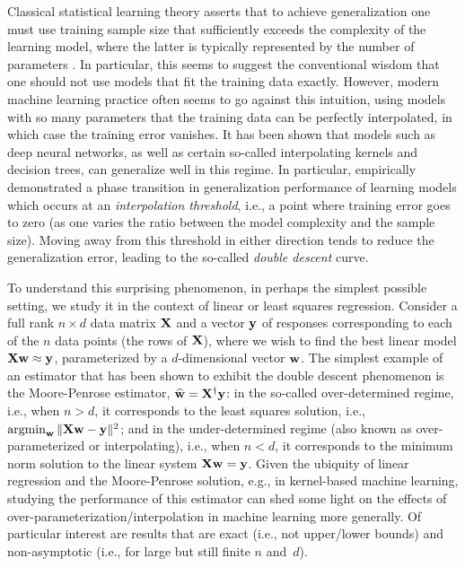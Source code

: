 \documentclass[../../thesis.tex]{subfiles}
\begin{document}
Classical statistical learning theory asserts that to achieve generalization
one must use training sample size that sufficiently exceeds the complexity of
the learning model, where the latter is typically represented by the number of
parameters \citep[or some related structural parameter; see][]{HFT09}.  In particular,
this seems to suggest the conventional wisdom that one should not use models
that fit the training data exactly.  However, modern machine learning practice
often seems to go against this intuition, using models with so many parameters
that the training data can be perfectly interpolated, in which case the
training error vanishes. It has been shown that models such as deep neural
networks, as well as certain so-called interpolating kernels and decision
trees, can generalize well in this regime. In particular,
\cite{BHMM19} empirically demonstrated a phase transition in generalization
performance of learning models which occurs at an \emph{interpolation
  threshold}, i.e., a point where training error goes to zero (as one varies the
ratio between the model complexity and the sample size). Moving away from this
threshold in either direction tends to reduce the generalization error, leading
to the so-called \emph{double descent} curve.

To understand this
surprising phenomenon, in perhaps the simplest possible setting, we
study it in the context of linear or least squares regression.
Consider a full rank $n\times d$ data matrix $\mathbf X$ and a vector $\mathbf y$ of
responses corresponding to each of the $n$ data points (the rows of $\mathbf X$), where we wish to
find the best linear model $\mathbf X\mathbf w\approx \mathbf y$, parameterized by a
$d$-dimensional vector $\mathbf w$.
The simplest example of an estimator that has been shown to exhibit
the double descent phenomenon \citep{belkin2019two} is the
Moore-Penrose estimator, $\widehat{\mathbf w}=\mathbf X^\dagger\mathbf y$:
in the so-called over-determined regime, i.e., when $n>d$, it corresponds to the
least squares solution, i.e., $\operatorname*{\mathop{\mathrm{argmin}}}_{\mathbf w} \|\mathbf X\mathbf w-\mathbf y\|^2$; and in the
under-determined regime (also known as
over-parameterized or interpolating), i.e., when $n<d$, it
corresponds to the minimum norm solution to the linear system $\mathbf X\mathbf w=\mathbf y$.
Given the ubiquity of linear regression and the Moore-Penrose
solution, e.g., in kernel-based machine learning, studying the
performance of this estimator can shed some light on the effects of
over-parameterization/interpolation in machine learning more generally.
Of particular interest are results that are exact (i.e., not upper/lower bounds) and
non-asymptotic (i.e., for large but still finite $n$ and~$d$).
\end{document}
